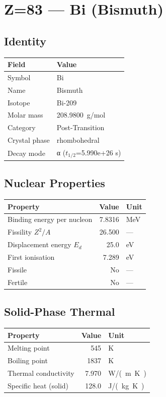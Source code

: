 \documentclass[11pt,a4paper]{article}
\begin{document}
\newpage

\section{Z=83 --- Bi (Bismuth)}
\label{sec:Z83}

\subsection{Identity}
\begin{tabular}{ll}
  \toprule
  Field & Value \\
  \midrule
  Symbol & Bi \\
  Name & Bismuth \\
  Isotope & Bi-209 \\
  Molar mass & \SI{208.9800}{g/mol} \\
  Category & Post-Transition \\
  Crystal phase & rhombohedral \\
  Decay mode & α ($t_{1/2}$=5.990e+26 s) \\
  \bottomrule
\end{tabular}

\subsection{Nuclear Properties}
\begin{tabular}{lrl}
  \toprule
  Property & Value & Unit \\
  \midrule
  Binding energy per nucleon & 7.8316 & \si{MeV} \\
  Fissility $Z^2/A$ & 26.500 & --- \\
  Displacement energy $E_d$ & 25.0 & \si{eV} \\
  First ionisation & 7.289 & \si{eV} \\
  Fissile & No & --- \\
  Fertile & No & --- \\
  \bottomrule
\end{tabular}

\subsection{Solid-Phase Thermal}
\begin{tabular}{lrl}
  \toprule
  Property & Value & Unit \\
  \midrule
  Melting point & 545 & \si{K} \\
  Boiling point & 1837 & \si{K} \\
  Thermal conductivity & 7.970 & \si{W/(m.K)} \\
  Specific heat (solid) & 128.0 & \si{J/(kg.K)} \\
  \bottomrule
\end{tabular}
\end{document}
